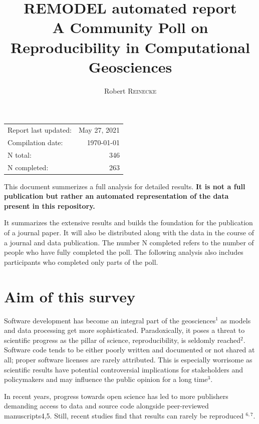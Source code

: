 \documentclass{article}
\title{\textbf{REMODEL automated report} \\ A Community Poll on Reproducibility in Computational Geosciences} %
\author{Robert \textsc{Reinecke}} %
\begin{document}
\maketitle %

\begin{center}
\begin{tabular}{l r}
Report last updated: & May 27, 2021\\
Compilation date: & \today \\
N total: & 346 \\
N completed: & 263\\
\end{tabular}
\end{center}

This document summerizes a full analysis for detailed results. \textbf{It is not a full publication but rather an automated representation of the data present in this repository.}

It summarizes the extensive results and builds the foundation for the publication of a journal paper.
It will also be distributed along with the data in the course of a journal and data publication.
The number N completed refers to the number of people who have fully completed the poll. The following analysis also includes participants who completed only parts of the poll.

\thispagestyle{empty}

\tableofcontents
\listoffigures

\newpage

\section{Aim of this survey}
Software development has become an integral part of the geosciences$^{1}$ as models and data processing get more sophisticated.
Paradoxically, it poses a threat to scientific progress as the pillar of science, reproducibility, is seldomly reached$^{2}$.
Software code tends to be either poorly written and documented or not shared at all; proper software licenses are rarely attributed.
This is especially worrisome as scientific results have potential controversial implications for stakeholders and policymakers and may influence the public opinion for a long time$^{3}$.

In recent years, progress towards open science has led to more publishers demanding access to data and source code alongside peer-reviewed manuscripts4,5. Still, recent studies find that results can rarely be reproduced $^{6,7}$.
\end{document}
